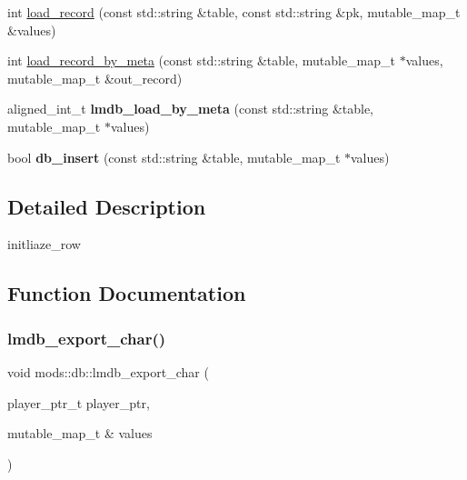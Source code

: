 \begin{DoxyCompactItemize}
\item 
int \hyperlink{namespacemods_1_1db_a0e743f7d6ff025f86a1bdbcc9b726e8c}{load\+\_\+record} (const std\+::string \&table, const std\+::string \&pk, mutable\+\_\+map\+\_\+t \&values)
\item 
int \hyperlink{namespacemods_1_1db_a2ec81c8ca3ce3f3a4b27b68645bf4e1d}{load\+\_\+record\+\_\+by\+\_\+meta} (const std\+::string \&table, mutable\+\_\+map\+\_\+t $\ast$values, mutable\+\_\+map\+\_\+t \&out\+\_\+record)
\item 
\mbox{\label{namespacemods_1_1db_ab14e0409a2059b7d3cadbba2c1712ead}} 
aligned\+\_\+int\+\_\+t {\bfseries lmdb\+\_\+load\+\_\+by\+\_\+meta} (const std\+::string \&table, mutable\+\_\+map\+\_\+t $\ast$values)
\item 
\mbox{\label{namespacemods_1_1db_a21477a1dfc16d08ecdad38983855e626}} 
bool {\bfseries db\+\_\+insert} (const std\+::string \&table, mutable\+\_\+map\+\_\+t $\ast$values)
\end{DoxyCompactItemize}


\subsection{Detailed Description}
initliaze\+\_\+row 

\subsection{Function Documentation}
\mbox{\label{namespacemods_1_1db_a2cb0a00d3700b5eab314405d909a8cce}} 
\subsubsection{\texorpdfstring{lmdb\+\_\+export\+\_\+char()}{lmdb\_export\_char()}}
{\footnotesize\ttfamily void mods\+::db\+::lmdb\+\_\+export\+\_\+char (\begin{DoxyParamCaption}\item[{player\+\_\+ptr\+\_\+t}]{player\+\_\+ptr,  }\item[{mutable\+\_\+map\+\_\+t \&}]{values }\end{DoxyParamCaption})}

